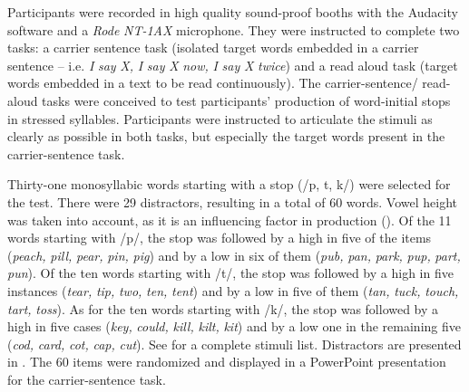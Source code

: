 \documentclass[output=paper]{langsci/langscibook}
\begin{document}
Participants were recorded in high quality sound-proof booths with the Audacity software and a \textit{Rode} \textit{NT-1AX} microphone. They were instructed to complete two tasks:  a carrier sentence task (isolated target words embedded in a carrier sentence – i.e. \textit{I} \textit{say} \textit{X,} \textit{I} \textit{say} \textit{X} \textit{now,} \textit{I} \textit{say} \textit{X} \textit{twice}) and a read aloud task (target words embedded in a text to be read continuously). The carrier-sentence/ read-aloud tasks were conceived to test participants’  production of word-initial stops in stressed syllables. Participants were instructed to articulate the stimuli as clearly as possible in both tasks, but especially the target words present in the carrier-sentence task.



Thirty-one monosyllabic words starting with a  stop (/p, t, k/) were selected for the test. There were 29 distractors, resulting in a total of 60 words. Vowel height was taken into account, as it is an influencing factor in  production (\citealt{YavaşWildermuth2006}). Of the 11 words starting with /p/, the stop was followed by a high  in five of the items (\textit{peach,} \textit{pill,} \textit{pear,} \textit{pin,} \textit{pig}) and by a low  in six of them (\textit{pub,} \textit{pan,} \textit{park,} \textit{pup,} \textit{part,} \textit{pun}). Of the ten words starting with /t/, the stop was followed by a high  in five instances (\textit{tear,} \textit{tip,} \textit{two,} \textit{ten,} \textit{tent}) and by a low  in five of them (\textit{tan,} \textit{tuck,} \textit{touch,} \textit{tart,} \textit{toss}). As for the ten words starting with /k/, the stop was followed by a high  in five cases (\textit{key,} \textit{could,} \textit{kill,} \textit{kilt,} \textit{kit}) and by a low one in the remaining five (\textit{cod,} \textit{card,} \textit{cot,} \textit{cap,} \textit{cut}). See  for a complete stimuli list. Distractors are presented in . The 60 items were randomized and displayed in a PowerPoint presentation for the carrier-sentence task.
\end{document}
